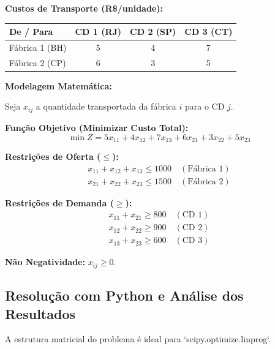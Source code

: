 \documentclass[conference]{IEEEtran}
\begin{document}
\textbf{Custos de Transporte (R\$/unidade):}
\begin{table}[h]
\centering
\begin{tabular}{lccc}
\toprule
\textbf{De / Para} & \textbf{CD 1 (RJ)} & \textbf{CD 2 (SP)} & \textbf{CD 3 (CT)} \\
\midrule
Fábrica 1 (BH) & 5 & 4 & 7 \\
Fábrica 2 (CP) & 6 & 3 & 5 \\
\bottomrule
\end{tabular}
\end{table}

\textbf{Modelagem Matemática:}

Seja $x_{ij}$ a quantidade transportada da fábrica $i$ para o CD $j$.

\textbf{Função Objetivo (Minimizar Custo Total):}
\begin{equation}
\min Z = 5x_{11} + 4x_{12} + 7x_{13} + 6x_{21} + 3x_{22} + 5x_{23}
\end{equation}

\textbf{Restrições de Oferta ($\le$):}
\begin{gather}
x_{11} + x_{12} + x_{13} \le 1000 \quad (\text{Fábrica 1}) \\
x_{21} + x_{22} + x_{23} \le 1500 \quad (\text{Fábrica 2})
\end{gather}

\textbf{Restrições de Demanda ($\ge$):}
\begin{gather}
x_{11} + x_{21} \ge 800 \quad (\text{CD 1}) \\
x_{12} + x_{22} \ge 900 \quad (\text{CD 2}) \\
x_{13} + x_{23} \ge 600 \quad (\text{CD 3})
\end{gather}

\textbf{Não Negatividade:} $x_{ij} \ge 0$.

\subsection{Resolução com Python e Análise dos Resultados}
A estrutura matricial do problema é ideal para `scipy.optimize.linprog`.
\end{document}

